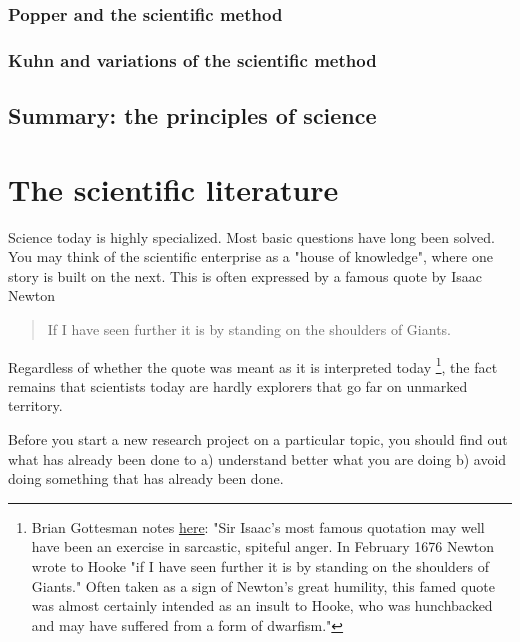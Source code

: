\documentclass{tufte-book}
\begin{document}
\subsection{Popper and the scientific method}


\subsection{Kuhn and variations of the scientific method}


\subsection{}


\section{Summary: the principles of science}





\chapter{The scientific literature}

Science today is highly specialized. Most basic questions have long been solved. You may think of the scientific enterprise as a "house of knowledge", where one story is built on the next. This is often expressed by a famous quote by Isaac Newton 

\begin{quote}
If I have seen further it is by standing on the shoulders of Giants.
\end{quote}

Regardless of whether the quote was meant as it is interpreted today \footnote{Brian Gottesman notes \href{http://mentalfloss.com/article/24520/6-things-you-should-know-about-isaac-newton}{here}: "Sir Isaac's most famous quotation may well have been an exercise in sarcastic, spiteful anger. In February 1676 Newton wrote to Hooke "if I have seen further it is by standing on the shoulders of Giants." Often taken as a sign of Newton's great humility, this famed quote was almost certainly intended as an insult to Hooke, who was hunchbacked and may have suffered from a form of dwarfism."
}, the fact remains that scientists today are hardly explorers that go far on unmarked territory. 


 

Before you start a new research project on a particular topic, you should find out what has already been done to a) understand better what you are doing b) avoid doing something that has already been done. 
\end{document}
